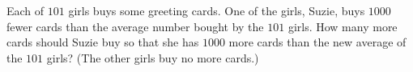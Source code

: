 Each of $101$ girls buys some greeting cards. One of the girls, Suzie, buys $1000$ fewer cards than the average number bought by the $101$ girls. How many more cards should Suzie buy so that she has $1000$ more cards than the new average of the $101$ girls? (The other girls buy no more cards.)
